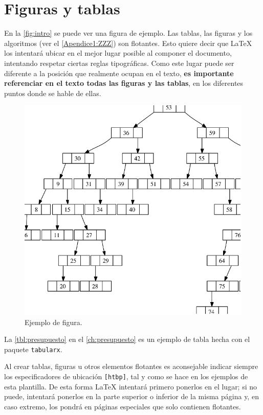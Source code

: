\section{Figuras y tablas}

\noindent En la \autoref{fig:intro} se puede ver una figura de ejemplo. Las tablas, las figuras y los algoritmos (ver el \autoref{Apendice1:ZZZ}) son flotantes. Esto quiere decir que \LaTeX{} los intentará ubicar en el mejor lugar posible al componer el documento, intentando respetar ciertas reglas tipográficas. Como este lugar puede ser diferente a la posición que realmente ocupan en el texto, \textbf{es importante referenciar en el texto todas las figuras y las tablas}, en los diferentes puntos donde se hable de ellas.

\begin{figure}[htbp]
   \centering
   \includegraphics[width=0.8\linewidth]{images/figura_1}
   \caption{Ejemplo de figura.}
   \label{fig:intro}
\end{figure}

La \autoref{tbl:presupuesto} en el \autoref{ch:presupuesto} es un ejemplo de tabla hecha con el paquete \verb|tabularx|.

Al crear tablas, figuras u otros elementos flotantes es aconsejable indicar siempre los especificadores de ubicación \verb|[htbp]|, tal y como se hace en los ejemplos de esta plantilla. De esta forma \LaTeX{} intentará primero ponerlos en el lugar; si no puede, intentará ponerlos en la parte superior o inferior de la misma página y, en caso extremo, los pondrá en páginas especiales que solo contienen flotantes.

